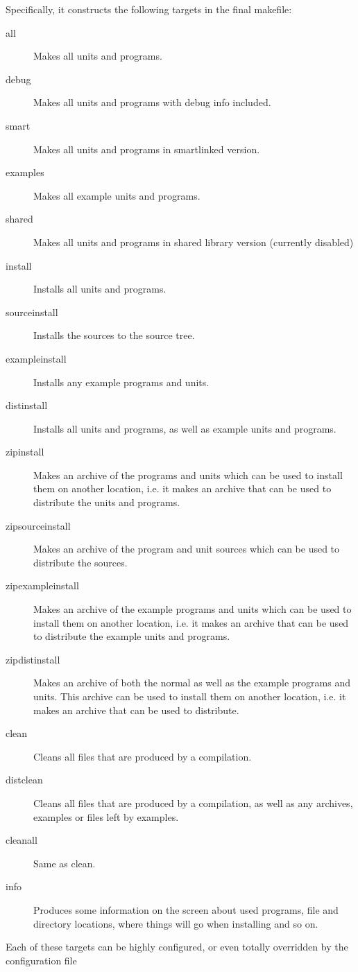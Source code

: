 {Specifically, it constructs the following targets in the final makefile:
\begin{description}
\item[all] Makes all units and programs.
\item[debug] Makes all units and programs with debug info included.
\item[smart] Makes all units and programs in smartlinked version.
\item[examples] Makes all example units and programs.
\item[shared] Makes all units and programs in shared library version
(currently disabled)
\item[install] Installs all units and programs.
\item[sourceinstall] Installs the sources to the \fpc source tree.
\item[exampleinstall] Installs any example programs and units.
\item[distinstall] Installs all units and programs, as well as example units
and programs.
\item[zipinstall] Makes an archive of the programs and units which can be
used to install them on another location, i.e. it makes an archive that can
be used to distribute the units and programs.
\item[zipsourceinstall] Makes an archive of the program and unit sources
which can be used to distribute the sources.
\item[zipexampleinstall] Makes an archive of the example programs and units 
which can be used to install them on another location, i.e. it makes an 
archive that can be used to distribute the example units and programs.
\item[zipdistinstall] Makes an archive of both the normal as well as the
example programs and units. This archive can be used to install them on 
another location, i.e. it makes an archive that can be used to 
distribute.
\item[clean] Cleans all files that are produced by a compilation.
\item[distclean] Cleans all files that are produced by a compilation, as
well as any archives, examples or files left by examples.
\item[cleanall] Same as clean.
\item[info] Produces some information on the screen about used programs,
file and directory locations, where things will go when installing and so
on.
\end{description}
Each of these targets can be highly configured, or even totally overridden
by the configuration file 

}
